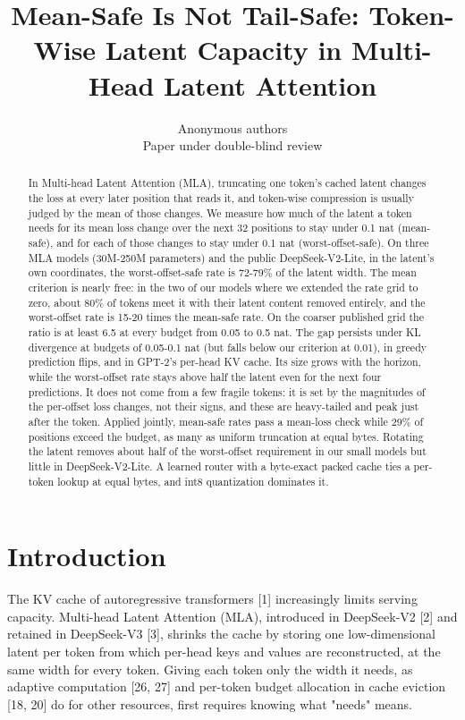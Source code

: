 \documentclass[10pt]{article}
\title{Mean-Safe Is Not Tail-Safe: Token-Wise Latent Capacity in Multi-Head Latent Attention}
\author{\name Anonymous authors \\ \addr Paper under double-blind review}
\date{}
\begin{document}
\maketitle

\begin{abstract}
In Multi-head Latent Attention (MLA), truncating one token's cached latent changes the loss at every later position that reads it, and token-wise compression is usually judged by the mean of those changes. We measure how much of the latent a token needs for its mean loss change over the next 32 positions to stay under 0.1 nat (mean-safe), and for each of those changes to stay under 0.1 nat (worst-offset-safe). On three MLA models (30M-250M parameters) and the public DeepSeek-V2-Lite, in the latent's own coordinates, the worst-offset-safe rate is 72-79\% of the latent width. The mean criterion is nearly free: in the two of our models where we extended the rate grid to zero, about 80\% of tokens meet it with their latent content removed entirely, and the worst-offset rate is 15-20 times the mean-safe rate. On the coarser published grid the ratio is at least 6.5 at every budget from 0.05 to 0.5 nat. The gap persists under KL divergence at budgets of 0.05-0.1 nat (but falls below our criterion at 0.01), in greedy prediction flips, and in GPT-2's per-head KV cache. Its size grows with the horizon, while the worst-offset rate stays above half the latent even for the next four predictions. It does not come from a few fragile tokens: it is set by the magnitudes of the per-offset loss changes, not their signs, and these are heavy-tailed and peak just after the token. Applied jointly, mean-safe rates pass a mean-loss check while 29\% of positions exceed the budget, as many as uniform truncation at equal bytes. Rotating the latent removes about half of the worst-offset requirement in our small models but little in DeepSeek-V2-Lite. A learned router with a byte-exact packed cache ties a per-token lookup at equal bytes, and int8 quantization dominates it.
\end{abstract}

\section{Introduction}

The KV cache of autoregressive transformers [1] increasingly limits serving capacity. Multi-head Latent Attention (MLA), introduced in DeepSeek-V2 [2] and retained in DeepSeek-V3 [3], shrinks the cache by storing one low-dimensional latent per token from which per-head keys and values are reconstructed, at the same width for every token. Giving each token only the width it needs, as adaptive computation [26, 27] and per-token budget allocation in cache eviction [18, 20] do for other resources, first requires knowing what "needs" means.
\end{document}
